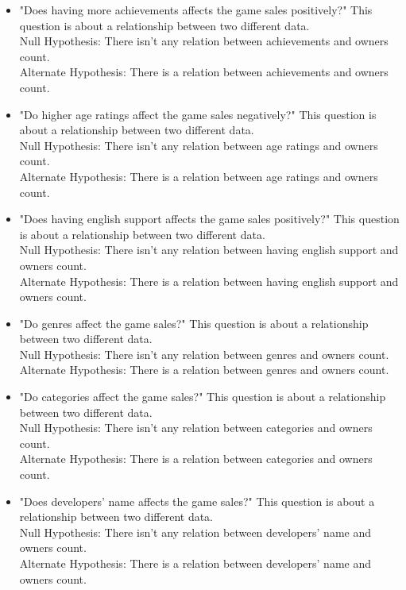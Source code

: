 \documentclass[conference]{IEEEtran}
\begin{document}
\begin{itemize}
    \item "Does having more achievements affects the game sales positively?" This question is about a relationship between two different data.\\Null
Hypothesis: There isn't any relation between achievements and owners count.\\ Alternate Hypothesis: There is a relation between achievements and owners count. \\
    \item "Do higher age ratings affect the game sales negatively?" This question is about a relationship between two different data.\\Null
Hypothesis: There isn't any relation between age ratings and owners count.\\ Alternate Hypothesis: There is a relation between age ratings and owners count. \\
    \item "Does having english support affects the game sales positively?" This question is about a relationship between two different data.\\Null
Hypothesis: There isn't any relation between having english support and owners count.\\ Alternate Hypothesis: There is a relation between having english support and owners count. \\
    \item "Do genres affect the game sales?" This question is about a relationship between two different data.\\Null
Hypothesis: There isn't any relation between genres and owners count.\\ Alternate Hypothesis: There is a relation between genres and owners count. \\
    \item "Do categories affect the game sales?" This question is about a relationship between two different data.\\Null
Hypothesis: There isn't any relation between categories and owners count.\\ Alternate Hypothesis: There is a relation between categories and owners count. \\
    \item "Does developers' name affects the game sales?" This question is about a relationship between two different data.\\Null
Hypothesis: There isn't any relation between developers' name and owners count.\\ Alternate Hypothesis: There is a relation between developers' name and owners count. \\

\end{itemize}
\end{document}

